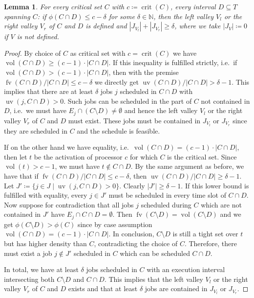 \documentclass[a4paper]{article}
\DeclareMathOperator{\fv}{fv}
\DeclareMathOperator{\uv}{uv}
\DeclareMathOperator{\vol}{vol}
\DeclareMathOperator{\crit}{crit}
\newtheorem{lemma}[theorem]{Lemma}
\begin{document}
\begin{lemma}\label{lemma:valley}
  For every critical set $C$ with $c \coloneqq \crit(C)$, every interval $D \subseteq T$ spanning $C$:
  if $\phi(C \cap D) \leq c - \delta$ for some $\delta \in \mathbb{N}$, then the left valley $V_l$ or the right valley $V_r$ of $C$ and $D$ is defined and $|J_{V_l}| + |J_{V_r}| \geq \delta$, where we take $|J_V| \coloneqq 0$ if $V$ is not defined.
\end{lemma}
\begin{proof}
  By choice of $C$ as critical set with $c = \crit(C)$ we have $\vol(C \cap D) \geq (c-1) \cdot |C \cap D|$.
  If this inequality is fulfilled strictly, i.e.\ if
  $\vol(C \cap D) > (c-1) \cdot |C \cap D|$, then with the premise
  $\fv(C \cap D) / |C \cap D| \leq c - \delta$ we directly get $\uv(C \cap D) / |C \cap D| > \delta - 1$.
  This implies that there are at least $\delta$ jobs $j$ scheduled in $C \cap D$ with $\uv(j, C \cap D) > 0$.
  Such jobs can be scheduled in the part of $C$ not contained in $D$, i.e.\ we must have $E_j \cap (C \setminus D) \neq \emptyset$ and hence the left valley $V_l$ or the right valley $V_r$ of $C$ and $D$ must exist.
  These jobs must be contained in $J_{V_l}$ or $J_{V_r}$ since they are scheduled in $C$ and the schedule is feasible.

  If on the other hand we have equality, i.e.\ $\vol(C \cap D) = (c-1) \cdot |C \cap D|$, then let $t$ be the activation of processor $c$ for which $C$ is the critical set.
  Since $\vol(t) > c-1$, we must have $t \notin C \cap D$.
  By the same argument as before, we have that if $\fv(C \cap D) / |C \cap D| \leq c - \delta$, then $\uv(C \cap D) / |C \cap D| \geq \delta - 1$.
  Let $J' \coloneqq \{ j \in J \mid \uv(j, C \cap D) > 0 \}$.
  Clearly $|J'| \geq \delta - 1$.
  If this lower bound is fulfilled with equality, every $j \in J'$ must be scheduled in every time slot of $C \cap D$.
  Now suppose for contradiction that all jobs $j$ scheduled during $C$ which are not contained in $J'$ have $E_j \cap C \cap D = \emptyset$.
  Then $\fv(C \setminus D) = \vol(C \setminus D)$ and
  we get $\phi(C \setminus D) > \phi(C)$ since by case assumption $\vol(C \cap D) = (c-1) \cdot |C \cap D|$.
  In conclusion, $C \setminus D$ is still a tight set over $t$ but has higher density than $C$, contradicting the choice of $C$.
  Therefore, there must exist a job $j \notin J'$ scheduled in $C$ which can be scheduled $C \cap D$.

  In total, we have at least $\delta$ jobs scheduled in $C$ with an execution interval intersecting both $C \setminus D$ and $C \cap D$.
  This implies that the left valley $V_l$ or the right valley $V_r$ of $C$ and $D$ exists and that at least $\delta$ jobs are contained in $J_{V_l}$ or $J_{V_r}$.
\end{proof}
\end{document}
